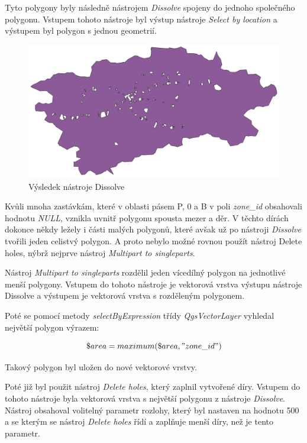 Tyto polygony byly následně nástrojem \textit{Dissolve} spojeny do jednoho společného polygonu.
Vstupem tohoto nástroje byl výstup nástroje \textit{Select by location} a výstupem byl polygon
s jednou geometrií. 

\begin{figure}[H] \centering
    \includegraphics[width=400pt]{./pictures/dissolve-P0B.png}
    \caption[Výsledek nástroje Dissolve]{Výsledek nástroje Dissolve}
	\label{fig:dissolve}              
\end{figure} 

Kvůli mnoha zastávkám, které v oblasti pásem P, 0 a B v poli \textit{zone\_id} obsahovali hodnotu \textit{NULL},
vznikla uvnitř polygonu spousta mezer a děr. V těchto dírách dokonce někdy ležely i části malých polygonů, které 
avšak už po nástroji \textit{Dissolve} tvořili jeden celistvý polygon. A proto nebylo možné rovnou použít nástroj Delete holes,
nýbrž nejprve nástroj \textit{Multipart to singleparts}.

Nástroj \textit{Multipart to singleparts} rozdělil jeden vícedílný polygon na jednotlivé menší polygony. Vstupem do tohoto
nástroje je vektorová vrstva výstupu nástroje Dissolve a výstupem je vektorová vrstva s rozděleným polygonem.

Poté se pomocí metody \textit{selectByExpression} třídy \textit{QgsVectorLayer} vyhledal nej\-větší polygon
výrazem:

\[\$area = maximum(\$area, "zone\_id")\]

Takový polygon byl uložen do nové vektorové vrstvy. 

Poté již byl použit nástroj \textit{Delete holes}, který zaplnil vytvořené díry. Vstupem do tohoto nástroje byla vektorová
vrstva s největší polygonu z nástroje \textit{Dissolve}. Nástroj obsahoval volitelný parametr rozlohy, který byl
nastaven na hodnotu 500 a se kterým se nástroj \textit{Delete holes} řídí a zaplňuje menší díry, než je tento parametr.  

